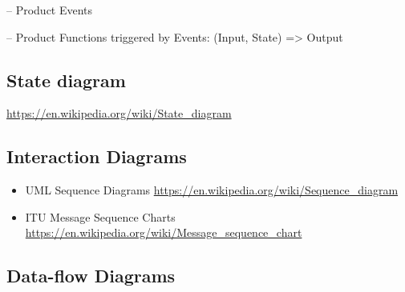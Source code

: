 -- Product Events

-- Product Functions triggered by Events: (Input, State) => Output

\subsection{State diagram}%
\url{https://en.wikipedia.org/wiki/State_diagram} 

\subsection{Interaction Diagrams}

\begin{itemize}
  \item UML Sequence Diagrams \url{https://en.wikipedia.org/wiki/Sequence_diagram}
  \item ITU Message Sequence Charts \url{https://en.wikipedia.org/wiki/Message_sequence_chart}
\end{itemize}

\subsection{Data-flow Diagrams}%
\url{} 


